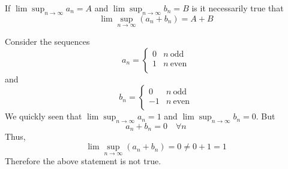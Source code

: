 \documentclass{homework}
\begin{document}



\begin{problem}[2-19]
  If $\lim \sup_{n\rightarrow\infty} a_n= A$ and $\lim \sup_{n\rightarrow\infty} b_n= B$ is it necessarily true that
  \[\lim \sup_{n\rightarrow\infty} (a_n + b_n) = A + B\]
\end{problem}

\begin{solution}
  Consider the sequences 
  \[a_n = \begin{cases} 
      0 & n\ \text{odd} \\
      1 & n\ \text{even}\\
   \end{cases}
  \]
  and
  \[b_n = \begin{cases} 
      0 & n\ \text{odd} \\
      -1 & n\ \text{even}\\
   \end{cases}
  \]
  We quickly seen that $\lim \sup_{n\rightarrow\infty} a_n= 1$ and $\lim \sup_{n\rightarrow\infty} b_n= 0$. But
  \[ a_n + b_n = 0 \quad \forall n\]
  Thus, 
  \[\lim \sup_{n\rightarrow\infty} (a_n + b_n)  = 0 \neq 0 + 1 = 1\]
  Therefore the above statement is not true.
\end{solution}
\end{document}
